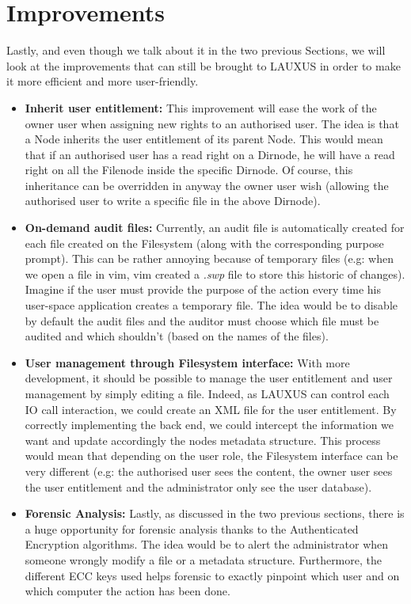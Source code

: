 \documentclass[../main.tex]{subfiles}
\begin{document}
\section{Improvements}
\label{section:analysis:improvements}
\par Lastly, and even though we talk about it in the two previous Sections, we will look at the improvements that can still be brought to LAUXUS in order to make it more efficient and more user-friendly.
\begin{itemize}
    \item \textbf{Inherit user entitlement:} This improvement will ease the work of the owner user when assigning new rights to an authorised user. The idea is that a Node inherits the user entitlement of its parent Node. This would mean that if an authorised user has a read right on a Dirnode, he will have a read right on all the Filenode inside the specific Dirnode. Of course, this inheritance can be overridden in anyway the owner user wish (allowing the authorised user to write a specific file in the above Dirnode).
    \item \textbf{On-demand audit files:} Currently, an audit file is automatically created for each file created on the Filesystem (along with the corresponding purpose prompt). This can be rather annoying because of temporary files (e.g: when we open a file in vim, vim created a \textit{.swp} file to store this historic of changes). Imagine if the user must provide the purpose of the action every time his user-space application creates a temporary file. The idea would be to disable by default the audit files and the auditor must choose which file must be audited and which shouldn't (based on the names of the files).
    \item \textbf{User management through Filesystem interface:} With more development, it should be possible to manage the user entitlement and user management by simply editing a file. Indeed, as LAUXUS can control each IO call interaction, we could create an XML file for the user entitlement. By correctly implementing the back end, we could intercept the information we want and update accordingly the nodes metadata structure. This process would mean that depending on the user role, the Filesystem interface can be very different (e.g: the authorised user sees the content, the owner user sees the user entitlement and the administrator only see the user database).
    \item \textbf{Forensic Analysis:} Lastly, as discussed in the two previous sections, there is a huge opportunity for forensic analysis thanks to the Authenticated Encryption algorithms. The idea would be to alert the administrator when someone wrongly modify a file or a metadata structure. Furthermore, the different ECC keys used helps forensic to exactly pinpoint which user and on which computer the action has been done.
\end{itemize}

    
\end{document}
